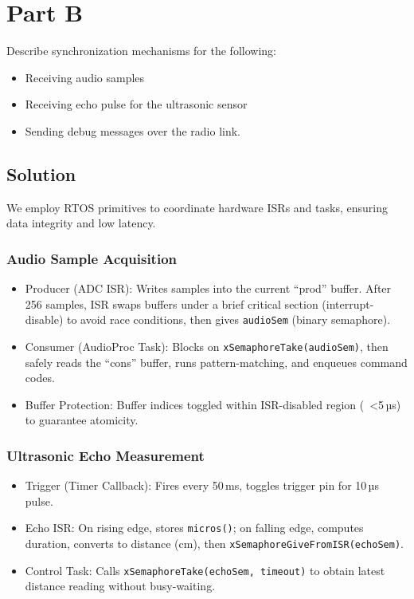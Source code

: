 \section*{Part B}

Describe synchronization mechanisms for the following:
\begin{itemize}[noitemsep, topsep=0pt]
    \item Receiving audio samples
    \item Receiving echo pulse for the ultrasonic sensor
    \item Sending debug messages over the radio link.
\end{itemize}

\subsection*{Solution}

We employ RTOS primitives to coordinate hardware ISRs and tasks, ensuring data integrity and low latency.

\subsubsection*{Audio Sample Acquisition}
\begin{itemize}
    \item Producer (ADC ISR): Writes samples into the current ``prod'' buffer. After 256 samples, ISR swaps buffers under a brief critical section (interrupt-disable) to avoid race conditions, then gives \texttt{audioSem} (binary semaphore).
    \item Consumer (AudioProc Task): Blocks on \texttt{xSemaphoreTake(audioSem)}, then safely reads the ``cons'' buffer, runs pattern-matching, and enqueues command codes.
    \item Buffer Protection: Buffer indices toggled within ISR-disabled region (~<5\,µs) to guarantee atomicity.
\end{itemize}

\subsubsection*{Ultrasonic Echo Measurement}
\begin{itemize}
    \item Trigger (Timer Callback): Fires every 50\,ms, toggles trigger pin for 10\,µs pulse.
    \item Echo ISR: On rising edge, stores \texttt{micros()}; on falling edge, computes duration, converts to distance (cm), then \texttt{xSemaphoreGiveFromISR(echoSem)}.
    \item Control Task: Calls \texttt{xSemaphoreTake(echoSem, timeout)} to obtain latest distance reading without busy-waiting.
\end{itemize}

